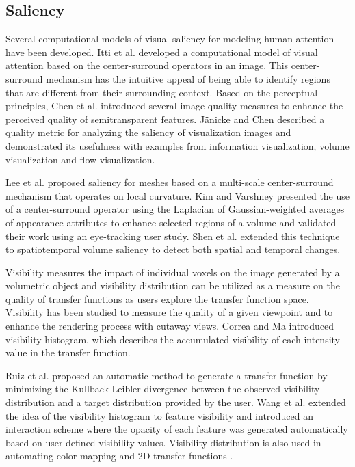 \documentclass{egpubl}
\begin{document}
\subsection{Saliency}
Several computational models of visual saliency for modeling human attention have been developed.
Itti et al. \cite{itti_model_1998} developed a computational model of visual attention based on the center-surround operators in an image. This center-surround mechanism has the intuitive appeal of being able to identify regions that are different from their surrounding context.
Based on the perceptual principles, Chen et al. \cite{chan_perception-based_2009} introduced several image quality measures to enhance the perceived quality of semitransparent features.
J{\"a}nicke and Chen \cite{janicke_salience-based_2010} described a quality metric for analyzing the saliency of visualization images and demonstrated its usefulness with examples from information visualization, volume visualization and flow visualization.

Lee et al. \cite{lee_mesh_2005} proposed saliency for meshes based on a multi-scale center-surround mechanism that operates on local curvature. Kim and Varshney \cite{kim_saliency-guided_2006} presented the use of a center-surround operator using the Laplacian of Gaussian-weighted averages of appearance attributes to enhance selected regions of a volume and validated their work using an eye-tracking user study. Shen et al. \cite{shen_spatiotemporal_2015} extended this technique to spatiotemporal volume saliency to detect both spatial and temporal changes.

Visibility measures the impact of individual voxels on the image generated by a volumetric object and visibility distribution can be utilized as a measure on the quality of transfer functions as users explore the transfer function space. Visibility has been studied to measure the quality of a given viewpoint \cite{bordoloi_view_2005} \cite{viola_importance-driven_2004} and to enhance the rendering process with cutaway views.
Correa and Ma \cite{correa_visibility_2011} introduced visibility histogram, which describes the accumulated visibility of each intensity value in the transfer function.

Ruiz et al. \cite{ruiz_automatic_2011} proposed an automatic method to generate a transfer function by minimizing the Kullback-Leibler divergence between the observed visibility distribution and a target distribution provided by the user. Wang et al. \cite{wang_efficient_2011} extended the idea of the visibility histogram to feature visibility and introduced an interaction scheme where the opacity of each feature was generated automatically based on user-defined visibility values. Visibility distribution is also used in automating color mapping \cite{cai_automatic_2013} and 2D transfer functions \cite{qin_voxel_2015}.
\end{document}
